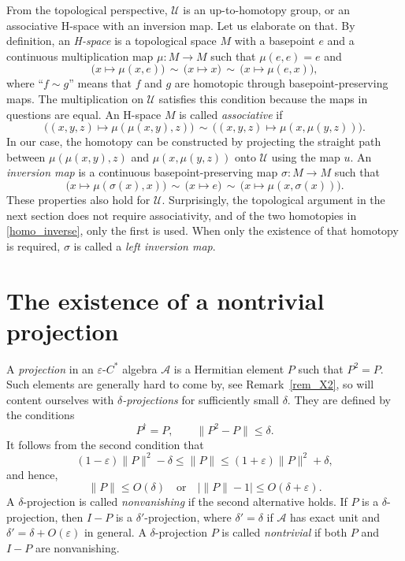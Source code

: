 \documentclass[12pt]{article}
\newcommand{\calA}{\mathcal{A}}
\newcommand{\calU}{\mathcal{U}}
\newcommand{\eps}{\varepsilon}
\renewcommand{\le}{\leqslant}
\newtheorem[definition]{Definition}[Theorem]{Definition}
\newtheorem[remark]{Example}[Theorem]{Example}
\newtheorem[remark]{Remark}[Theorem]{Remark}
\newtheorem[remark]{Question}[Theorem]{Open question}
\newtheorem*[definition]{definition}{Definition}
\newtheorem*[remark]{example}{Example}
\newtheorem*[remark]{remark}{Remark}
\newtheorem*[remark]{question}{Open question}
\numberwithin{equation}{section}
\begin{document}
From the topological perspective, $\calU$ is an up-to-homotopy group, or an associative H-space with an inversion map. Let us elaborate on that. By definition, an \emph{H-space} is a topological space $M$ with a basepoint $e$ and a continuous multiplication map $\mu\colon M\to M$ such that $\mu(e,e)=e$ and
\begin{equation}\label{H-unit}
\bigl(x\mapsto \mu(x,e)\bigr)
\,\sim\,\bigl(x\mapsto x\bigr)
\,\sim\,\bigl(x\mapsto \mu(e,x)\bigr),
\end{equation}
where ``$f\sim g$'' means that $f$ and $g$ are homotopic through basepoint-preserving maps. The multiplication on $\calU$ satisfies this condition because the maps in questions are equal. An H-space $M$ is called \emph{associative} if
\begin{equation}
\bigl((x,y,z)\mapsto \mu(\mu(x,y),z)\bigr)
\,\sim\,\bigl((x,y,z)\mapsto \mu(x,\mu(y,z))\bigr).
\end{equation}
In our case, the homotopy can be constructed by projecting the straight path between $\mu(\mu(x,y),z)$ and $\mu(x,\mu(y,z))$ onto $\calU$ using the map $u$. An \emph{inversion map} is a continuous basepoint-preserving map $\sigma\colon M\to M$ such that
\begin{equation}\label{homo_inverse}
\bigl(x\mapsto \mu(\sigma(x),x)\bigr)
\,\sim\,\bigl(x\mapsto e\bigr)
\,\sim\,\bigl(x\mapsto \mu(x,\sigma(x))\bigr).
\end{equation}
These properties also hold for $\calU$. Surprisingly, the topological argument in the next section does not require associativity, and of the two homotopies in \eqref{homo_inverse}, only the first is used. When only the existence of that homotopy is required, $\sigma$ is called a \emph{left inversion map}.


\section{The existence of a nontrivial projection}\label{sec_projection}

A \emph{projection} in an $\eps$-$C^*$ algebra $\calA$ is a Hermitian element $P$ such that $P^2=P$. Such elements are generally hard to come by, see Remark~\ref{rem_X2}, so will content ourselves with \emph{$\delta$-projections} for sufficiently small $\delta$. They are defined by the conditions
\begin{equation}\label{delta_P}
P^\dag=P,\qquad \|P^2-P\|\le\delta.
\end{equation}
It follows from the second condition that
\[
(1-\eps)\|P\|^2-\delta \le \|P\| \le (1+\eps)\|P\|^2+\delta,
\]
and hence,
\begin{equation}\label{P_alternatives}
\|P\|\le O(\delta)\quad \text{or}\quad \bigl|\|P\|-1\bigr|\le O(\delta+\eps).
\end{equation}
A $\delta$-projection is called \emph{nonvanishing} if the second alternative holds. If $P$ is a $\delta$-projection, then $I-P$ is a $\delta'$-projection, where $\delta'=\delta$ if $\calA$ has exact unit and $\delta'=\delta+O(\eps)$ in general. A $\delta$-projection $P$ is called \emph{nontrivial} if both $P$ and $I-P$ are nonvanishing.
\end{document}
